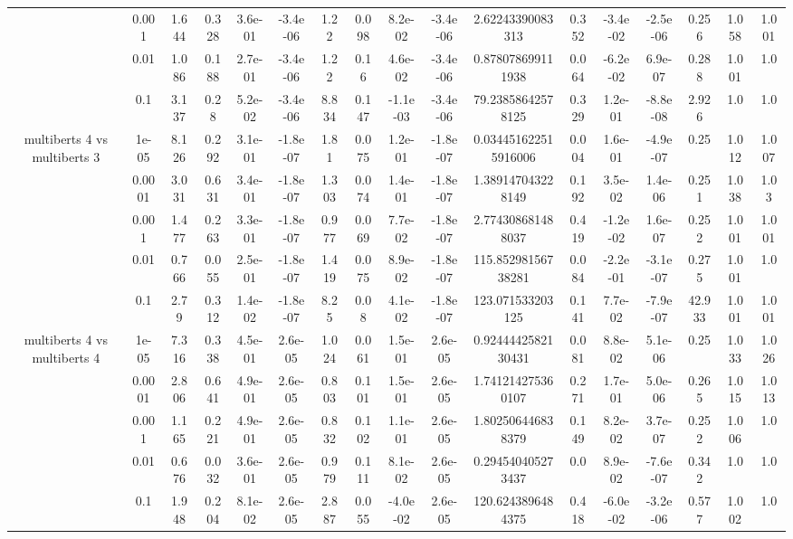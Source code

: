 \begin{tabular}{|c|c|c|c|c|c|c|c|c|c|c|c|c|c|c|c|c|}
 & 0.001 & 1.644 & 0.328 & 3.6e-01 & -3.4e-06 & 1.22 & 0.098 & 8.2e-02 & -3.4e-06 & 2.62243390083313 & 0.352 & -3.4e-02 & -2.5e-06 & 0.256 & 1.058 & 1.001 \\
 & 0.01 & 1.086 & 0.188 & 2.7e-01 & -3.4e-06 & 1.22 & 0.16 & 4.6e-02 & -3.4e-06 & 0.878078699111938 & 0.064 & -6.2e-02 & 6.9e-07 & 0.288 & 1.001 & 1.0 \\
 & 0.1 & 3.137 & 0.28 & 5.2e-02 & -3.4e-06 & 8.834 & 0.147 & -1.1e-03 & -3.4e-06 & 79.23858642578125 & 0.329 & 1.2e-01 & -8.8e-08 & 2.926 & 1.0 & 1.0 \\
\hline
\multirow{5}{*}{multiberts 4 vs multiberts 3} & 1e-05 & 8.126 & 0.292 & 3.1e-01 & -1.8e-07 & 1.81 & 0.075 & 1.2e-01 & -1.8e-07 & 0.034451622515916006 & 0.004 & 1.6e-01 & -4.9e-07 & 0.25 & 1.012 & 1.007 \\
 & 0.0001 & 3.031 & 0.631 & 3.4e-01 & -1.8e-07 & 1.303 & 0.074 & 1.4e-01 & -1.8e-07 & 1.389147043228149 & 0.192 & 3.5e-02 & 1.4e-06 & 0.251 & 1.038 & 1.03 \\
 & 0.001 & 1.477 & 0.263 & 3.3e-01 & -1.8e-07 & 0.977 & 0.069 & 7.7e-02 & -1.8e-07 & 2.774308681488037 & 0.419 & -1.2e-02 & 1.6e-07 & 0.252 & 1.001 & 1.001 \\
 & 0.01 & 0.766 & 0.055 & 2.5e-01 & -1.8e-07 & 1.419 & 0.075 & 8.9e-02 & -1.8e-07 & 115.85298156738281 & 0.084 & -2.2e-01 & -3.1e-07 & 0.275 & 1.001 & 1.0 \\
 & 0.1 & 2.79 & 0.312 & 1.4e-02 & -1.8e-07 & 8.25 & 0.08 & 4.1e-02 & -1.8e-07 & 123.071533203125 & 0.141 & 7.7e-02 & -7.9e-07 & 42.933 & 1.001 & 1.001 \\
\hline
\multirow{5}{*}{multiberts 4 vs multiberts 4} & 1e-05 & 7.316 & 0.338 & 4.5e-01 & 2.6e-05 & 1.024 & 0.061 & 1.5e-01 & 2.6e-05 & 0.9244442582130431 & 0.081 & 8.8e-02 & 5.1e-06 & 0.25 & 1.033 & 1.026 \\
 & 0.0001 & 2.806 & 0.641 & 4.9e-01 & 2.6e-05 & 0.803 & 0.101 & 1.5e-01 & 2.6e-05 & 1.741214275360107 & 0.271 & 1.7e-01 & 5.0e-06 & 0.265 & 1.015 & 1.013 \\
 & 0.001 & 1.165 & 0.221 & 4.9e-01 & 2.6e-05 & 0.832 & 0.102 & 1.1e-01 & 2.6e-05 & 1.802506446838379 & 0.149 & 8.2e-02 & 3.7e-07 & 0.252 & 1.006 & 1.0 \\
 & 0.01 & 0.676 & 0.032 & 3.6e-01 & 2.6e-05 & 0.979 & 0.111 & 8.1e-02 & 2.6e-05 & 0.294540405273437 & 0.0 & 8.9e-02 & -7.6e-07 & 0.342 & 1.0 & 1.0 \\
 & 0.1 & 1.948 & 0.204 & 8.1e-02 & 2.6e-05 & 2.887 & 0.055 & -4.0e-02 & 2.6e-05 & 120.6243896484375 & 0.418 & -6.0e-02 & -3.2e-06 & 0.577 & 1.002 & 1.0 \\

\end{tabular}
